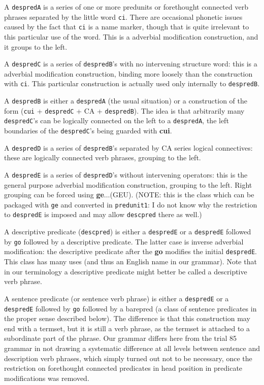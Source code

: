\documentclass[12pt]{book}
\begin{document}
A {\tt despredA} is a series of one or more predunits or forethought connected verb phrases separated by the little word {\tt ci}.  There are occasional phonetic issues caused by the fact that {\tt ci} is a name marker, though that is quite irrelevant to this particular use of the word.  This is a adverbial modification construction, and it groups to the left.

A {\tt despredC} is a series of {\tt despredB}'s with no intervening structure word:  this is a adverbial modification construction, binding more loosely
than the construction with {\tt ci}.  This particular construction is actually used only internally to {\tt despredB}.

A {\tt despredB} is either a {\tt despredA} (the usual situation)
or a construction of the form ({\tt cui} + {\tt despredC} + CA + {\tt despredB}).   The idea is that arbitrarily many {\tt despredC}'s can be logically connected on the left to a {\tt despredA}, the left boundaries of the {\tt despredC}'s being guarded with {\bf cui}.

A {\tt despredD} is a series of {\tt despredB}'s separated by CA series logical connectives:  these are logically connected verb phrases,
grouping to the left.

A {\tt despredE} is a series of {\tt despredD}'s without intervening operators:  this is the general purpose adverbial modification construction, grouping to the left.  Right grouping can be forced using {\bf ge}$\ldots$(GEU).  (NOTE:  this is the class which can be packaged with {\tt ge} and converted in
{\tt predunit1}:  I do not know why the restriction to {\tt despredE} is imposed and may allow {\tt descpred} there as well.)

A descriptive predicate ({\tt descpred}) is either a {\tt despredE} or a {\tt despredE} followed by {\tt go} followed by a descriptive predicate.  The latter case is inverse adverbial modification:  the descriptive predicate after the {\bf go} modifies the initial {\tt despredE}.  This class has many uses (and thus an English name in our grammar).  Note that in our terminology a descriptive predicate might better be called a descriptive verb phrase.

A sentence predicate (or sentence verb phrase) is either a {\tt despredE} or a {\tt despredE} followed by {\tt go} followed by a barepred (a class of sentence predicates in the proper sense described below).  The difference is that this construction may end with a termset, but it is still a verb phrase,
as the termset is attached to a subordinate part of the phrase.  Our grammar differs here from the trial 85 grammar in not drawing a systematic difference at all levels between sentence and description verb phrases, which simply turned out not to be necessary, once the restriction
on forethought connected predicates in head position in predicate modifications was removed.
\end{document}
